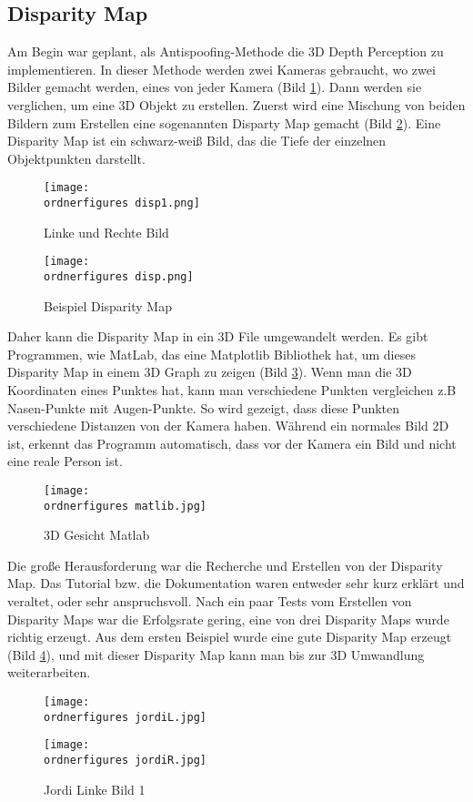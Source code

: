 \subsection{Disparity Map}
Am Begin war geplant, als Antispoofing-Methode die 3D Depth Perception zu implementieren. In dieser Methode werden zwei Kameras gebraucht, wo zwei Bilder gemacht werden, eines von jeder Kamera (Bild \ref{fig:bilder1}). Dann werden sie verglichen, um eine 3D Objekt zu erstellen. Zuerst wird eine Mischung von beiden Bildern zum Erstellen eine sogenannten Disparty Map gemacht (Bild \ref{fig:dispm1}). Eine Disparity Map ist ein schwarz-weiß Bild, das die Tiefe der einzelnen Objektpunkten darstellt.
\begin{figure}[ht]
  \centering
    \texttt{[image: \\ordnerfigures disp1.png]}
      \caption{Linke und Rechte Bild \cite{disparityM}}
      \label{fig:bilder1}
\end{figure}
\begin{figure}[ht]
  \centering
    \texttt{[image: \\ordnerfigures disp.png]}
      \caption{Beispiel Disparity Map \cite{disparityM}}
      \label{fig:dispm1}
\end{figure}
\bigbreak
Daher kann die Disparity Map in ein 3D File umgewandelt werden. Es gibt Programmen, wie MatLab, das eine Matplotlib Bibliothek hat, um dieses Disparity Map in einem 3D Graph zu zeigen (Bild \ref{fig:matlab}). Wenn man die 3D Koordinaten eines Punktes hat, kann man verschiedene Punkten vergleichen z.B Nasen-Punkte mit Augen-Punkte. So wird gezeigt, dass diese Punkten verschiedene Distanzen von der Kamera haben. Während ein normales Bild 2D ist, erkennt das Programm automatisch, dass vor der Kamera ein Bild und nicht eine reale Person ist.
\begin{figure}[ht]
  \centering
    \texttt{[image: \\ordnerfigures matlib.jpg]}
      \caption{3D Gesicht Matlab \cite{matlab}}
      \label{fig:matlab}
\end{figure}
\bigbreak
Die große Herausforderung war die Recherche und Erstellen von der Disparity Map. Das Tutorial bzw. die Dokumentation waren entweder sehr kurz erklärt und veraltet, oder sehr anspruchsvoll. Nach ein paar Tests vom Erstellen von Disparity Maps war die Erfolgsrate gering, eine von drei Disparity Maps wurde  richtig erzeugt.
\bigbreak
\newpage
Aus dem ersten Beispiel wurde eine gute Disparity Map erzeugt (Bild \ref{fig:gutdm}), und mit dieser Disparity Map kann man bis zur 3D Umwandlung  weiterarbeiten.
\begin{figure}[!htb]
   \begin{minipage}{0.48\textwidth}
     \centering
     \texttt{[image: \\ordnerfigures jordiL.jpg]}
     \caption{Jordi Linke Bild 1}
     \label{fig:gutdm}
   \end{minipage}\hfill
   \begin{minipage}{0.48\textwidth}
     \centering
     \texttt{[image: \\ordnerfigures jordiR.jpg]}
     \caption{Jordi Linke Bild 1}
   \end{minipage}
\end{figure}
